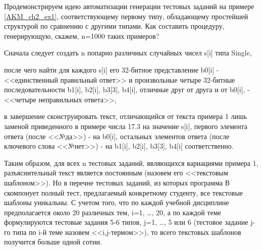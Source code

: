 Продемонстрируем идею автоматизации генерации тестовых заданий на примере \ref{AKM_ch2_ex1}, соответствующему первому типу, обладающему
простейшей структурой по сравнению с другими типами. Как составить процедуру, генерирующую, скажем,
\foreignlanguage{english}{n}=1000 таких примеров?

Сначала следует создать \foreignlanguage{english}{n} попарно различных случайных чисел
\foreignlanguage{english}{s}[\foreignlanguage{english}{i}] типа \foreignlanguage{english}{Single},

после чего найти для каждого \foreignlanguage{english}{s}[\foreignlanguage{english}{i}] его 32-битное представление
\foreignlanguage{english}{b}0[\foreignlanguage{english}{i}] - <<единственный правильный ответ>> и произвольные четыре
32-битные последовательности \foreignlanguage{english}{b}1[\foreignlanguage{english}{i}],
\foreignlanguage{english}{b}2[\foreignlanguage{english}{i}], \foreignlanguage{english}{b}3[3],
\foreignlanguage{english}{b}4[\foreignlanguage{english}{i}], отличные друг от друга и от
\foreignlanguage{english}{b}0[\foreignlanguage{english}{i}], - <<четыре неправильных ответа>>,

в завершение сконструировать текст, отличающийся от текста примера 1 лишь заменой приведенного в примере числа 17.3 на
значение \foreignlanguage{english}{s}[\foreignlanguage{english}{i}], первого элемента ответа (после <<№да>>) - на
\foreignlanguage{english}{b}0[\foreignlanguage{english}{i}], остальных элементов ответа (после ключевого слова <<№нет>>)
- на \foreignlanguage{english}{b}1[\foreignlanguage{english}{i}],
\foreignlanguage{english}{b}2[\foreignlanguage{english}{i}], \foreignlanguage{english}{b}3[3],
\foreignlanguage{english}{b}4[\foreignlanguage{english}{i}] соответственно.

Таким образом, для всех \foreignlanguage{english}{n} тестовых заданий, являющихся вариациями примера 1, разъяснительный
текст является постоянным (назовем его <<текстовым шаблоном>>). Но в перечне тестовых заданий, из которых программа В
скомпонует полный тест, предлагаемый конкретному студенту, все текстовые шаблоны уникальны. С учетом того, что по
каждой учебной дисциплине предполагается около 20 различных тем, \foreignlanguage{english}{i}=1, …, 20, а по каждой
теме формулируются тестовые задания 5-6 типов, \foreignlanguage{english}{j}=1, …, 5 или 6 (тестовое задание
\foreignlanguage{english}{j}{}-го типа по \foreignlanguage{english}{i}{}-й теме назовем
<<\foreignlanguage{english}{i},\foreignlanguage{english}{j}{}-термом>>), то всего текстовых шаблонов получится больше
одной сотни.

